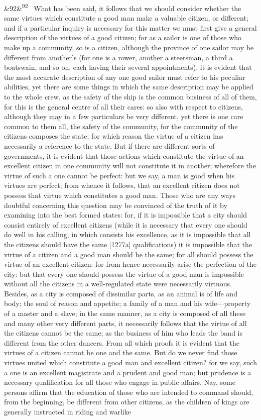 \documentclass[12pt]{article}
\newcommand{\para}[1][]{\par\noindent\ifx&#1&\else\textsuperscript{\footnotesize #1}~\fi}
\begin{document}
\para[92] What has been said, it follows that we should consider whether the same virtues which constitute a good man make a valuable citizen, or different; and if a particular inquiry is necessary for this matter we must first give a general description of the virtues of a good citizen; for as a sailor is one of those who make up a community, so is a citizen, although the province of one sailor may be different from another's (for one is a rower, another a steersman, a third a boatswain, and so on, each having their several appointments), it is evident that the most accurate description of any one good sailor must refer to his peculiar abilities, yet there are some things in which the same description may be applied to the whole crew, as the safety of the ship is the common business of all of them, for this is the general centre of all their cares: so also with respect to citizens, although they may in a few particulars be very different, yet there is one care common to them all, the safety of the community, for the community of the citizens composes the state; for which reason the virtue of a citizen has necessarily a reference to the state. But if there are different sorts of governments, it is evident that those actions which constitute the virtue of an excellent citizen in one community will not constitute it in another; wherefore the virtue of such a one cannot be perfect: but we say, a man is good when his virtues are perfect; from whence it follows, that an excellent citizen does not possess that virtue which constitutes a good man. Those who are any ways doubtful concerning this question may be convinced of the truth of it by examining into the best formed states: for, if it is impossible that a city should consist entirely of excellent citizens (while it is necessary that every one should do well in his calling, in which consists his excellence, as it is impossible that all the citizens should have the same [1277a] qualifications) it is impossible that the virtue of a citizen and a good man should be the same; for all should possess the virtue of an excellent citizen: for from hence necessarily arise the perfection of the city: but that every one should possess the virtue of a good man is impossible without all the citizens in a well-regulated state were necessarily virtuous. Besides, as a city is composed of dissimilar parts, as an animal is of life and body; the soul of reason and appetite; a family of a man and his wife---property of a master and a slave; in the same manner, as a city is composed of all these and many other very different parts, it necessarily follows that the virtue of all the citizens cannot be the same; as the business of him who leads the band is different from the other dancers. From all which proofs it is evident that the virtues of a citizen cannot be one and the same. But do we never find those virtues united which constitute a good man and excellent citizen? for we say, such a one is an excellent magistrate and a prudent and good man; but prudence is a necessary qualification for all those who engage in public affairs. Nay, some persons affirm that the education of those who are intended to command should, from the beginning, be different from other citizens, as the children of kings are generally instructed in riding and warlike 
\end{document}
